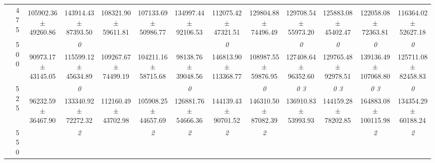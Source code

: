 \begin{table}[h]
{\begin{tabular}{
        ccccccccccccc}
 & \multirow{2}{*}{475}& \cellcolor[HTML]{EFEFEF} & \cellcolor[HTML]{EFEFEF} & \cellcolor[HTML]{EFEFEF} & \cellcolor[HTML]{EFEFEF} & \cellcolor[HTML]{EFEFEF} & \cellcolor[HTML]{EFEFEF} & \cellcolor[HTML]{EFEFEF} & \cellcolor[HTML]{EFEFEF} & \cellcolor[HTML]{EFEFEF} & \cellcolor[HTML]{EFEFEF} & \cellcolor[HTML]{EFEFEF}  \\ 
 & & \cellcolor[HTML]{EFEFEF} 105902.36 $\pm$ 49260.86& \cellcolor[HTML]{EFEFEF} 143914.43 $\pm$ 87393.50& \cellcolor[HTML]{EFEFEF} 108321.90 $\pm$ 59611.81& \cellcolor[HTML]{EFEFEF} 107133.69 $\pm$ 50986.77& \cellcolor[HTML]{EFEFEF} 134997.44 $\pm$ 92106.53& \cellcolor[HTML]{EFEFEF} 112075.42 $\pm$ 47321.51& \cellcolor[HTML]{EFEFEF} 129804.88 $\pm$ 74496.49& \cellcolor[HTML]{EFEFEF} 129708.54 $\pm$ 55973.20& \cellcolor[HTML]{EFEFEF} 125883.08 $\pm$ 45402.47& \cellcolor[HTML]{EFEFEF} 122058.08 $\pm$ 72363.81& \cellcolor[HTML]{EFEFEF} 116364.02 $\pm$ 52627.18 \\ 
 & \multirow{2}{*}{500}& & \textit{ 0 }& & & & \textit{ 0 }& & \textit{ 0 }& \textit{ 0 }& \textit{ 0 }& \textit{ 0 } \\ 
 & & 90973.17 $\pm$ 43145.05& 115599.12 $\pm$ 45634.89& 109267.67 $\pm$ 74499.19& 104211.16 $\pm$ 58715.68& 98138.76 $\pm$ 39048.56& 146813.90 $\pm$ 113368.77& 108987.55 $\pm$ 59876.95& 127408.64 $\pm$ 96352.60& 129765.48 $\pm$ 92978.51& 139136.49 $\pm$ 107068.80& 125711.08 $\pm$ 82458.83 \\ 
 & \multirow{2}{*}{525}& \cellcolor[HTML]{EFEFEF} & \cellcolor[HTML]{EFEFEF} \textit{ 0 }& \cellcolor[HTML]{EFEFEF} & \cellcolor[HTML]{EFEFEF} & \cellcolor[HTML]{EFEFEF} \textit{ 0 }& \cellcolor[HTML]{EFEFEF} & \cellcolor[HTML]{EFEFEF} \textit{ 0 }& \cellcolor[HTML]{EFEFEF} \textit{ 0 3 }& \cellcolor[HTML]{EFEFEF} \textit{ 0 3 }& \cellcolor[HTML]{EFEFEF} \textit{ 0 3 }& \cellcolor[HTML]{EFEFEF} \textit{ 0 } \\ 
 & & \cellcolor[HTML]{EFEFEF} 96232.59 $\pm$ 36467.90& \cellcolor[HTML]{EFEFEF} 133340.92 $\pm$ 72272.32& \cellcolor[HTML]{EFEFEF} 112160.49 $\pm$ 43702.98& \cellcolor[HTML]{EFEFEF} 105908.25 $\pm$ 44657.69& \cellcolor[HTML]{EFEFEF} 126881.76 $\pm$ 54666.36& \cellcolor[HTML]{EFEFEF} 144139.43 $\pm$ 90701.52& \cellcolor[HTML]{EFEFEF} 146310.50 $\pm$ 87082.39& \cellcolor[HTML]{EFEFEF} 136910.83 $\pm$ 53993.93& \cellcolor[HTML]{EFEFEF} 144159.28 $\pm$ 78202.85& \cellcolor[HTML]{EFEFEF} 164883.08 $\pm$ 100115.98& \cellcolor[HTML]{EFEFEF} 134354.29 $\pm$ 60188.24 \\ 
 & \multirow{2}{*}{550}& & \textit{ 2 }& & \textit{ 2 }& \textit{ 2 }& \textit{ 2 }& \textit{ 2 }& & & \textit{ 2 }& \textit{ 2 } \\ 

\end{tabular}}
\end{table}
